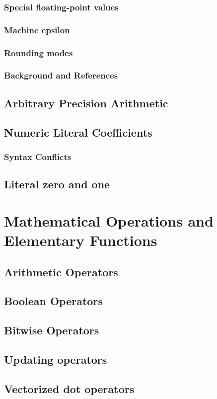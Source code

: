    \subsection{Special floating-point values}
    \subsection{Machine epsilon}
    \subsection{Rounding modes}
    \subsection{Background and References}
    \section{Arbitrary Precision Arithmetic}
    \section{Numeric Literal Coefficients}
    \subsection{Syntax Conflicts}
    \section{Literal zero and one}
  \chapter{Mathematical Operations and Elementary Functions}
    \section{Arithmetic Operators}
    \section{Boolean Operators}
    \section{Bitwise Operators}
    \section{Updating operators}
    \section{Vectorized {\textquotedbl}dot{\textquotedbl} operators}

